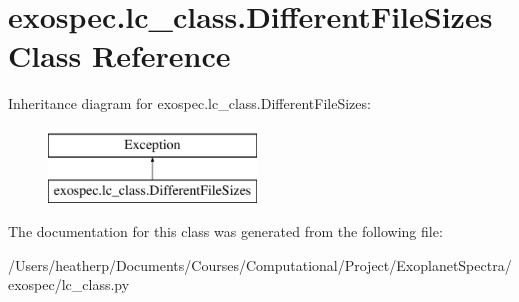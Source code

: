 \hypertarget{classexospec_1_1lc__class_1_1_different_file_sizes}{}\section{exospec.\+lc\+\_\+class.\+Different\+File\+Sizes Class Reference}
\label{classexospec_1_1lc__class_1_1_different_file_sizes}
Inheritance diagram for exospec.\+lc\+\_\+class.\+Different\+File\+Sizes\+:\begin{figure}[H]
\begin{center}
\leavevmode
\includegraphics[height=2.000000cm]{classexospec_1_1lc__class_1_1_different_file_sizes}
\end{center}
\end{figure}


The documentation for this class was generated from the following file\+:\begin{DoxyCompactItemize}
\item 
/\+Users/heatherp/\+Documents/\+Courses/\+Computational/\+Project/\+Exoplanet\+Spectra/exospec/lc\+\_\+class.\+py\end{DoxyCompactItemize}
